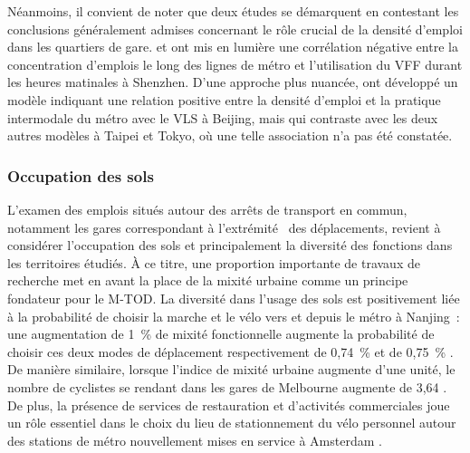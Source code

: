 \begin{refsegment}
Néanmoins, il convient de noter que deux études se démarquent en contestant les conclusions généralement admises concernant le rôle crucial de la densité d'emploi dans les quartiers de gare. \textcolor{blue}{\textcite[10]{guo_built_2020}} et \textcolor{blue}{\textcite[389]{guo_role_2021}} ont mis en lumière une corrélation négative entre la concentration d'emplois le long des lignes de métro et l'utilisation du \acrshort{VFF} durant les heures matinales à Shenzhen. D'une approche plus nuancée, \textcolor{blue}{\textcite[214]{lin_built_2018}} ont développé un modèle indiquant une relation positive entre la densité d'emploi et la pratique intermodale du métro avec le \acrshort{VLS} à Beijing, mais qui contraste avec les deux autres modèles à Taipei et Tokyo, où une telle association n'a pas été constatée.%

\subsubsection*{Occupation des sols
    \label{chap2:occupation-sols}
    }

L'examen des emplois situés autour des arrêts de transport en commun, notamment les gares correspondant à l'extrémité ~des déplacements, revient à considérer l'occupation des sols et principalement la diversité des fonctions dans les territoires étudiés. À ce titre, une proportion importante de travaux de recherche met en avant la place de la mixité urbaine comme un principe fondateur pour le \acrshort{M-TOD}. La diversité dans l'usage des sols est positivement liée à la probabilité de choisir la marche et le vélo vers et depuis le métro à Nanjing~: une augmentation de 1~\% de mixité fonctionnelle augmente la probabilité de choisir ces deux modes de déplacement respectivement de 0,74~\% et de 0,75~\% \textcolor{blue}{\autocite[182]{gan_associations_2021}}. De manière similaire, lorsque l'indice de mixité urbaine augmente d'une unité, le nombre de cyclistes se rendant dans les gares de Melbourne augmente de 3,64 \textcolor{blue}{\autocite[401]{weliwitiya_bicycle_2019}}. De plus, la présence de services de restauration et d'activités commerciales joue un rôle essentiel dans le choix du lieu de stationnement du vélo personnel autour des stations de métro nouvellement mises en service à Amsterdam \textcolor{blue}{\autocite[343]{kampen_bicycle_2021}}.%


\end{refsegment}
